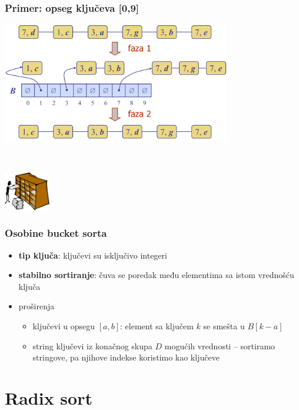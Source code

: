 \documentclass[compress,aspectratio=169]{beamer}
\begin{document}
\begin{frame}
  \frametitle{Primer: opseg ključeva [0,9]}
  \includegraphics[width=10cm]{asp-12-pic32.png}
  
  \ %
  
  \hfill\includegraphics[width=2cm]{asp-12-pic33.png}
\end{frame}

\begin{frame}
  \frametitle{Osobine bucket sorta}
  \begin{itemize}
    \item \textbf{tip ključa}: ključevi su isključivo integeri
    \item \textbf{stabilno sortiranje}: čuva se poredak među elementima sa istom vrednošću ključa
    \item proširenja
    \begin{itemize}
      \item ključevi u opsegu $[a,b]$: element sa ključem $k$ se smešta u $B[k-a]$
      \item string ključevi iz konačnog skupa $D$ mogućih vrednosti -- sortiramo stringove, pa njihove indekse koristimo kao ključeve
    \end{itemize}
  \end{itemize}
\end{frame}

\section[Radix sort]{Radix sort}
\end{document}
